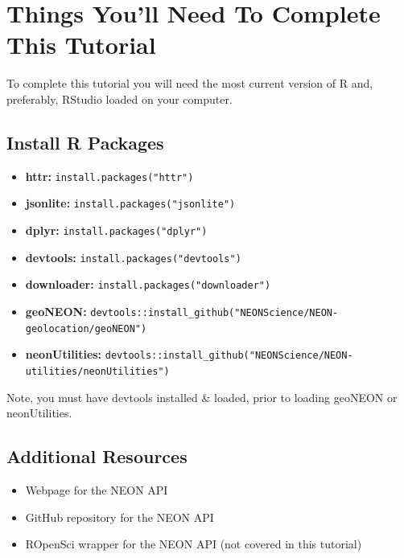 \documentclass[]{book}
\providecommand{\tightlist}{%
  \setlength{\itemsep}{0pt}\setlength{\parskip}{0pt}}
\begin{document}
\hypertarget{things-youll-need-to-complete-this-tutorial-1}{%
\section{Things You'll Need To Complete This Tutorial}\label{things-youll-need-to-complete-this-tutorial-1}}

To complete this tutorial you will need the most current version of R and,
preferably, RStudio loaded on your computer.

\hypertarget{install-r-packages-1}{%
\subsection{Install R Packages}\label{install-r-packages-1}}

\begin{itemize}
\tightlist
\item
  \textbf{httr:} \texttt{install.packages("httr")}
\item
  \textbf{jsonlite:} \texttt{install.packages("jsonlite")}
\item
  \textbf{dplyr:} \texttt{install.packages("dplyr")}
\item
  \textbf{devtools:} \texttt{install.packages("devtools")}
\item
  \textbf{downloader:} \texttt{install.packages("downloader")}
\item
  \textbf{geoNEON:} \texttt{devtools::install\_github("NEONScience/NEON-geolocation/geoNEON")}
\item
  \textbf{neonUtilities:} \texttt{devtools::install\_github("NEONScience/NEON-utilities/neonUtilities")}
\end{itemize}

Note, you must have devtools installed \& loaded, prior to loading geoNEON or neonUtilities.

\hypertarget{additional-resources-1}{%
\subsection{Additional Resources}\label{additional-resources-1}}

\begin{itemize}
\tightlist
\item
  Webpage for the NEON API
\item
  GitHub repository for the NEON API
\item
   ROpenSci wrapper for the NEON API (not covered in this tutorial)
\end{itemize}
\end{document}
